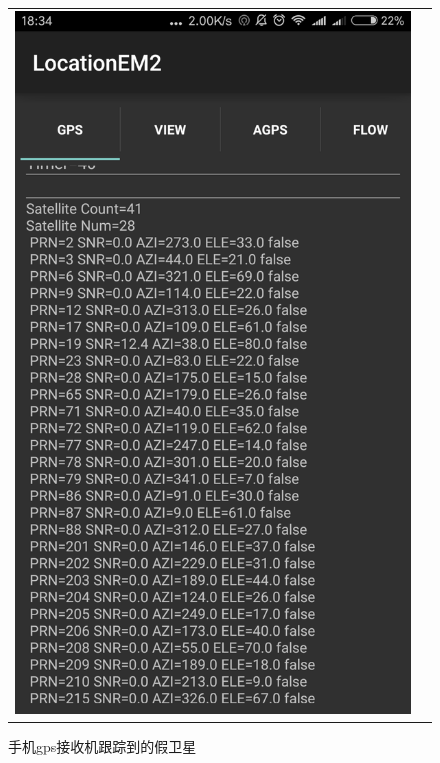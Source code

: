 \documentclass[UTF8,titlepage]{ctexart}
\begin{document}
\begin{figure}[H]
\begin{tabular}{cc}
\begin{minipage}{.5\textwidth}
    \caption{使用rtl测得的载波频谱}
    \label{fig:rtlCar}
    \end{minipage}
    \begin{minipage}{.5\textwidth}
    \includegraphics[width = \textwidth]{prn19.eps}
    \caption{手机gps接收机跟踪到的假卫星}
    \label{fig:prn19}
    \end{minipage}
  \end{tabular}
\end{figure}
\end{document}
